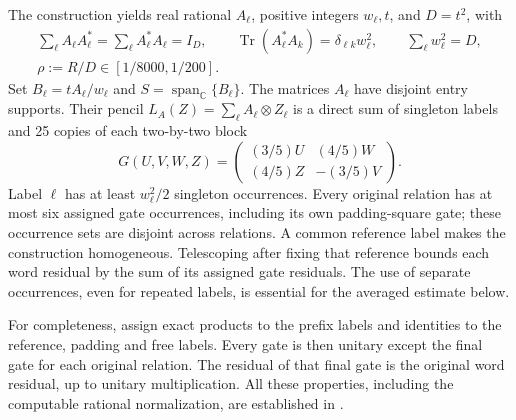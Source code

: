\documentclass[11pt,a4paper]{article}
\newcommand{\C}{\mathbb C}
\newcommand{\Tr}{\operatorname{Tr}}
\begin{document}
The construction yields real rational $A_\ell$, positive integers $w_\ell,t$, and $D=t^2$, with
\begin{gather}
 \sum_\ell A_\ell A_\ell^*=\sum_\ell A_\ell^*A_\ell=I_D,\qquad
 \Tr(A_\ell^*A_k)=\delta_{\ell k}w_\ell^2,\qquad
 \sum_\ell w_\ell^2=D,                              \label{eq:weights}\\
 \rho:=R/D\in[1/8000,1/200].
\end{gather}
Set $B_\ell=tA_\ell/w_\ell$ and $S=\operatorname{span}_{\C}\{B_\ell\}$.
The matrices $A_\ell$ have disjoint entry supports. Their pencil $L_A(Z)=\sum_\ell A_\ell\otimes Z_\ell$ is a direct sum of singleton labels and 25 copies of each two-by-two block
\begin{equation}
 G(U,V,W,Z)=
 \begin{pmatrix}(3/5)U&(4/5)W\\(4/5)Z&-(3/5)V\end{pmatrix}.
                                                               \label{eq:gate}
\end{equation}
Label $\ell$ has at least $w_\ell^2/2$ singleton occurrences. Every original relation has at most six assigned gate occurrences, including its own padding-square gate; these occurrence sets are disjoint across relations. A common reference label makes the construction homogeneous. Telescoping after fixing that reference bounds each word residual by the sum of its assigned gate residuals. The use of separate occurrences, even for repeated labels, is essential for the averaged estimate below.

For completeness, assign exact products to the prefix labels and identities to the reference, padding and free labels. Every gate is then unitary except the final gate for each original relation. The residual of that final gate is the original word residual, up to unitary multiplication. All these properties, including the computable rational normalization, are established in \cite[Sections 2--5]{compiler}.
\end{document}
